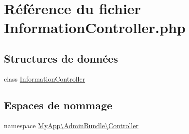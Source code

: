 \hypertarget{_information_controller_8php}{\section{Référence du fichier Information\-Controller.\-php}
\label{_information_controller_8php}
}
\subsection*{Structures de données}
\begin{DoxyCompactItemize}
\item 
class \hyperlink{class_my_app_1_1_admin_bundle_1_1_controller_1_1_information_controller}{Information\-Controller}
\end{DoxyCompactItemize}
\subsection*{Espaces de nommage}
\begin{DoxyCompactItemize}
\item 
namespace \hyperlink{namespace_my_app_1_1_admin_bundle_1_1_controller}{My\-App\textbackslash{}\-Admin\-Bundle\textbackslash{}\-Controller}
\end{DoxyCompactItemize}
